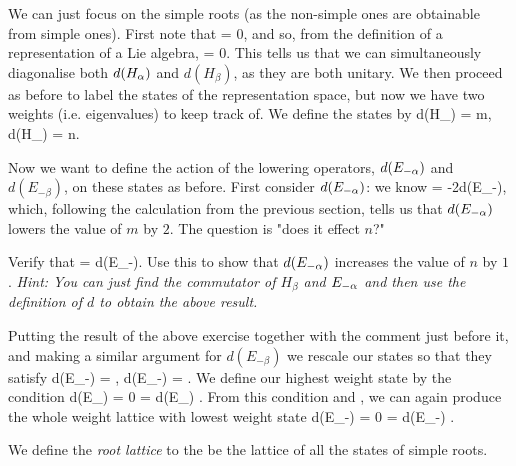 We can just focus on the simple roots (as the non-simple ones are obtainable from simple ones). First note that 
\bse 
    [H_{\a},H_{\beta}] = 0,
\ese 
and so, from the definition of a representation of a Lie algebra, 
\bse 
    [d(H_{\a}), d(H_{\beta})] = 0.
\ese    
This tells us that we can simultaneously diagonalise both $d(H_{\alpha})$ and $d(H_{\beta})$, as they are both unitary. We then proceed as before to label the states of the representation space, but now we have two weights (i.e. eigenvalues) to keep track of. We define the states by 
\be 
    d(H_{\a}) = m, \qand d(H_{\beta}) = n.
\ee 

Now we want to define the action of the lowering operators, $d(E_{-\alpha})$ and $d(E_{-\beta})$, on these states as before. First consider $d(E_{-\alpha})$: we know
\bse 
    [d(H_{\a}),d(E_{-\a})] = -2d(E_{-\a}),
\ese 
which, following the calculation from the previous section, tells us that $d(E_{-\alpha})$ lowers the value of $m$ by $2$. The question is "does it effect $n$?" 

\bbox 
    Verify that 
    \bse 
        [d(H_{\beta}),d(E_{-\a})] =  d(E_{-\a}).
    \ese 
    Use this to show that $d(E_{-\alpha})$ increases the value of $n$ by $1$. \textit{Hint: You can just find the commutator of $H_{\beta}$ and $E_{-\alpha}$ and then use the definition of $d$ to obtain the above result. }
\ebox 

Putting the result of the above exercise together with the comment just before it, and making a similar argument for $d(E_{-\beta})$ we rescale our states so that they satisfy
\be 
\label{eqn:su(3)statesRaisingLowering}
    d(E_{-\a})  = , \qand d(E_{-\beta})  = .
\ee 
We define our highest weight state by the condition 
\bse 
    d(E_{\a})  = 0 = d(E_{\beta}) .
\ese 
From this condition and , we can again produce the whole weight lattice with lowest weight state 
\bse 
    d(E_{-\a})  = 0 = d(E_{-\beta}) .
\ese 

    We define the \textit{root lattice} to the be the lattice of all the states of simple roots.
\ed 

